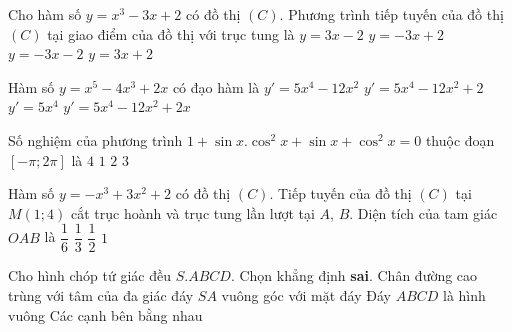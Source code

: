 \begin{ex}%
Cho hàm số $y=x^3-3x+2$ có đồ thị $(C)$. Phương trình tiếp tuyến của đồ thị $(C)$ tại giao điểm của đồ thị với trục tung là
\choice
{$y=3x-2$}
{\True $y=-3x+2$}
{$y=-3x-2$}
{$y=3x+2$}
\end{ex}

\begin{ex}%
Hàm số $y=x^5-4x^3+2x$ có đạo hàm là
\choice
{$y'=5x^4-12x^2$}
{\True $y'=5x^4-12x^2+2$}
{$y'=5x^4$}
{$y'=5x^4-12x^2+2x$}
\end{ex}

\begin{ex}%
Số nghiệm của phương trình $1+\sin x.\cos^2 x+\sin x+\cos^2 x=0$ thuộc đoạn $[-\pi;2\pi]$ là
\choice
{$4$}
{$1$}
{\True $2$}
{$3$}
\end{ex}

\begin{ex}%
Hàm số $y=-x^3+3x^2+2$ có đồ thị $(C)$. Tiếp tuyến của đồ thị $(C)$ tại $M(1;4)$ cắt trục hoành và trục tung lần lượt tại $A$, $B$. Diện tích của tam giác $OAB$ là
\choice
{\True $\dfrac{1}{6}$}
{$\dfrac{1}{3}$}
{$\dfrac{1}{2}$}
{$1$}
\end{ex}

\begin{ex}%
Cho hình chóp tứ giác đều $S.ABCD$. Chọn khẳng định \textbf{sai}.
\choice
{Chân đường cao trùng với tâm của đa giác đáy}
{\True $SA$ vuông góc với mặt đáy}
{Đáy $ABCD$ là hình vuông}
{Các cạnh bên bằng nhau}
\end{ex}

